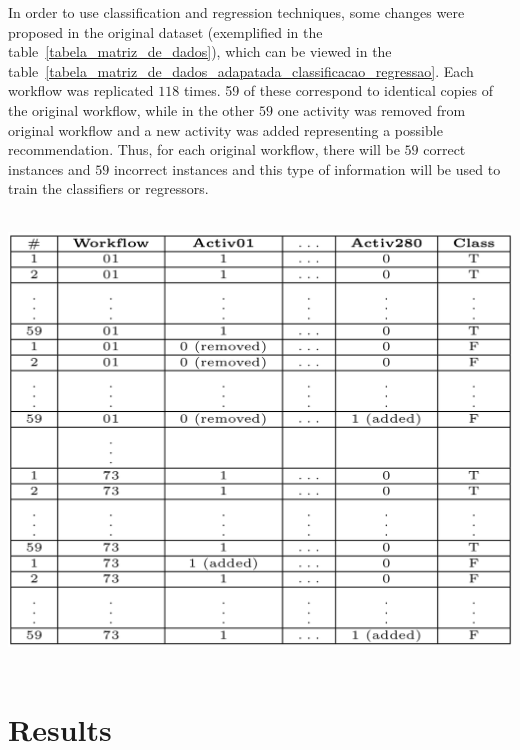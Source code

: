 \documentclass[40pt, a0, portrait]{a0poster}
\begin{document}
\begin{multicols}{2}
In order to use classification and regression techniques, some changes were proposed in the original dataset (exemplified in the table~\ref{tabela_matriz_de_dados}), which can be viewed in the table~\ref{tabela_matriz_de_dados_adapatada_classificacao_regressao}. Each workflow was replicated \(118\) times. 59 of these correspond to identical copies of the original workflow, while in the other \(59\) one activity was removed from original workflow and a new activity was added representing a possible recommendation. Thus, for each original workflow, there will be \(59\) correct instances and \(59\) incorrect instances and this type of information will be used to train the classifiers or regressors.

\begin{center}\vspace{1cm}
\includegraphics[height=12cm, width=28cm]{matrizAdaptada.png}
\end{center}\vspace{1cm}


\section*{Results}


\end{multicols}
\end{document}
